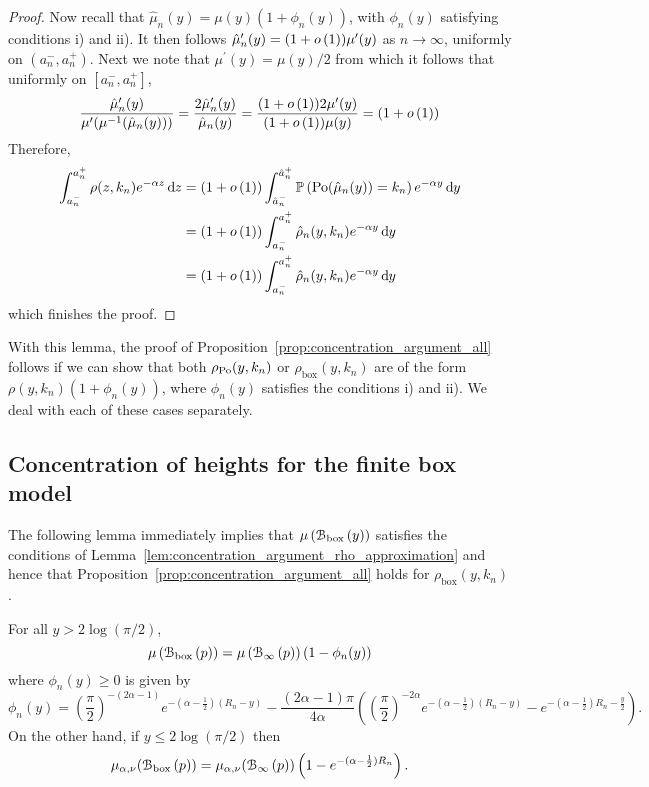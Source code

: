 \begin{proof}
Now recall that $\hat{\mu}_n(y) = \mu(y)(1 + \phi_n(y))$, with $\phi_n(y)$ satisfying conditions i) and ii). It then follows $\hat{\mu}_n^\prime(y) = (1 + o\left(1\right))\mu^\prime(y)$ as $n \to \infty$, uniformly on $(a_n^-, a_n^+)$. Next we note that $\mu^\prime(y) = \mu(y)/2$ from which it follows that uniformly on $[a_n^-, a_n^+]$,
\[
	\frac{\hat{\mu}_n^\prime(y)}{\mu^\prime(\mu^{-1}(\hat{\mu}_n(y)))}
	= \frac{2\hat{\mu}_n^\prime(y)}{\hat{\mu}_n(y)}
	= \frac{(1 + o\left(1\right))2\mu^\prime(y)}{(1 + o\left(1\right))\mu(y)}
	= (1+o\left(1\right))
\]
Therefore,
\begin{align*}
	\int_{a_n^-}^{a_n^+} \rho(z,k_n) e^{-\alpha z} \operatorname{\mathrm{d}\hspace{-2pt}} z
	&= (1 + o\left(1\right))\int_{\hat{a}_n^-}^{\hat{a}_n^+} \mathbb{P}\left({\mathrm{Po}}(\hat{\mu}_n(y)) = k_n\right) e^{-\alpha y} \operatorname{\mathrm{d}\hspace{-2pt}} y\\
	&= (1 + o\left(1\right)) \int_{a_n^-}^{a_n^+} \hat{\rho}_n(y,k_n) e^{-\alpha y} \operatorname{\mathrm{d}\hspace{-2pt}} y\\
	&= (1 + o\left(1\right)) \int_{a_n^-}^{a_n^+} \hat{\rho}_n(y,k_n) e^{-\alpha y} \operatorname{\mathrm{d}\hspace{-2pt}} y
\end{align*}
which finishes the proof.
\end{proof}

With this lemma, the proof of Proposition~\ref{prop:concentration_argument_all} follows if we can show that both $\rho_{{\mathrm{Po}}}(y,k_n)$ or $\rho_{\text{box}}(y,k_n)$ are of the form $\rho(y,k_n)(1 + \phi_n(y))$, where $\phi_n(y)$ satisfies the conditions i) and ii). We deal with each of these cases separately.

\subsection{Concentration of heights for the finite box model}\label{ssec:average_degree_P_n}

The following lemma immediately implies that $\mu\left({\mathcal B}_{\text{box}}\left(y\right)\right)$ satisfies the conditions of Lemma~\ref{lem:concentration_argument_rho_approximation} and hence that Proposition~\ref{prop:concentration_argument_all} holds for $\rho_{\text{box}}(y,k_n)$.

\begin{lemma}\label{lem:average_degree_P_n}
For all $y > 2\log(\pi/2)$,
\[
	\mu\left({\mathcal B}_{\text{box}}\left(p\right)\right) = \mu\left({\mathcal B}_{\infty}\left(p\right)\right)\left(1 - \phi_n(y)\right)
\]
where $\phi_n(y) \ge 0$ is given by
\[
	\phi_n(y) = \left(\frac{\pi}{2}\right)^{-(2\alpha - 1)}e^{-(\alpha-\frac{1}{2})(R_n - y)}
	- \frac{(2\alpha - 1)\pi}{4\alpha}\left(\left(\frac{\pi}{2}\right)^{-2\alpha} 
	e^{-(\alpha - \frac{1}{2})(R_n - y)} - e^{-(\alpha - \frac{1}{2})R_n - \frac{y}{2}}\right).
\]
On the other hand, if $y \le 2 \log(\pi/2)$ then
\[
	\mu_{\alpha,\nu}({\mathcal B}_{\text{box}}\left(p\right)) = \mu_{\alpha,\nu}({\mathcal B}_{\infty}\left(p\right))\left(1 - e^{-(\alpha - \frac{1}{2})R_n}\right).
\]
\end{lemma}

